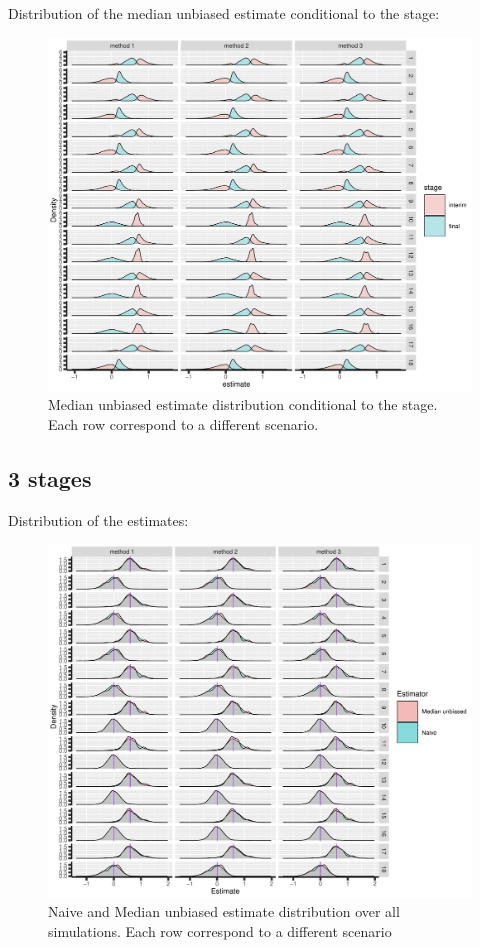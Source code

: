 \documentclass[12pt]{article}
\begin{document}
\clearpage

Distribution of the median unbiased estimate conditional to the stage:
\begin{figure}[!h]
\centering
\includegraphics[trim={0 0 0 0},width=1\textwidth]{./figures/gg2stage-estimateC-density.pdf}
\caption{Median unbiased estimate distribution conditional to the stage. Each row correspond to a different scenario.}
\end{figure}

\clearpage

\subsection{3 stages}
\label{sec:orgddcd92f}

Distribution of the estimates:
\begin{figure}[!h]
\centering
\includegraphics[trim={0 0 0 0},width=1\textwidth]{./figures/gg3stage-estimate-density.pdf}
\caption{Naive and Median unbiased estimate distribution over all simulations. Each row correspond to a different scenario}
\end{figure}
\end{document}
